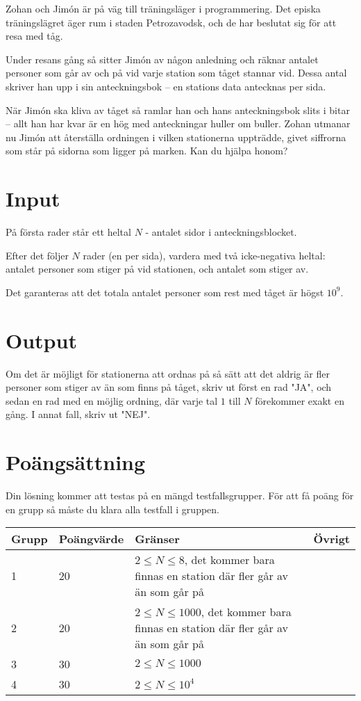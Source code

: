 
Zohan och Jimón är på väg till träningsläger i programmering. Det episka träningslägret äger rum i staden Petrozavodsk, och de har beslutat sig för att resa med tåg.

Under resans gång så sitter Jimón av någon anledning och räknar antalet personer som går av och på vid varje station som tåget stannar vid. Dessa antal skriver han
upp i sin anteckningsbok -- en stations data antecknas per sida.

När Jimón ska kliva av tåget så ramlar han och hans anteckningsbok slits i bitar -- allt han har kvar är en hög med anteckningar huller om buller. Zohan utmanar nu
Jimón att återställa ordningen i vilken stationerna uppträdde, givet siffrorna som står på sidorna som ligger på marken. Kan du hjälpa honom?

\section*{Input}
På första rader står ett heltal $N$ - antalet sidor i anteckningsblocket.

Efter det följer $N$ rader (en per sida), vardera med två icke-negativa heltal: antalet personer som stiger på vid stationen, och antalet som stiger av.

Det garanteras att det totala antalet personer som rest med tåget är högst $10^9$.

\section*{Output}
Om det är möjligt för stationerna att ordnas på så sätt att det aldrig är fler personer som stiger av än som finns på tåget, skriv ut först en rad "JA", och sedan en rad med en möjlig ordning, där varje tal $1$ till $N$ förekommer exakt en gång.
I annat fall, skriv ut "NEJ".

\section*{Poängsättning}
Din lösning kommer att testas på en mängd testfallsgrupper. För att få poäng för en grupp så måste du klara alla testfall i gruppen.

\begin{tabular}{| l | l | l | l |}
\hline
Grupp & Poängvärde & Gränser & Övrigt\\ \hline
1     & 20         & $ 2 \le N \le 8 $, det kommer bara finnas en station där fler går av än som går på & \\ \hline
2     & 20         & $ 2 \le N \le 1000 $, det kommer bara finnas en station där fler går av än som går på & \\ \hline
3     & 30         & $ 2 \le N \le 1000 $ & \\ \hline
4     & 30         & $ 2 \le N \le 10^4 $ & \\ \hline
\end{tabular}
